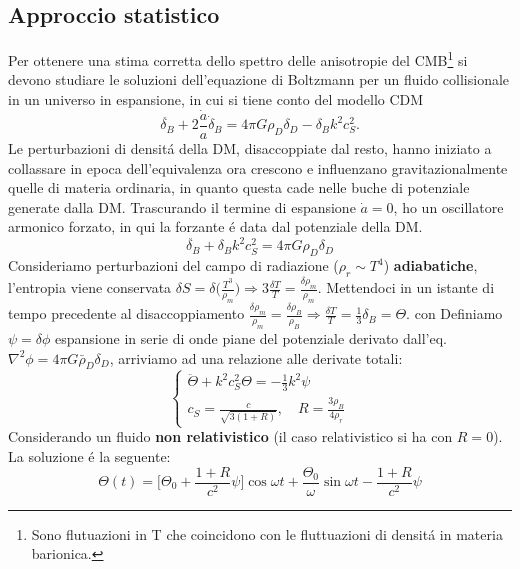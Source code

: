 \documentclass[12pt, a4paper]{article}
\begin{document}
\subsection{Approccio statistico}
Per ottenere una stima corretta dello spettro delle anisotropie del CMB\footnote{Sono flutuazioni in T che coincidono con le fluttuazioni di densit\'{a} in materia barionica.} si devono studiare le soluzioni dell'equazione di Boltzmann per un fluido collisionale in un universo in espansione, in cui si tiene conto del modello CDM
\begin{equation}
\ddot{\delta_B}+2 \frac{\dot{a}}{a}\dot{\delta}_B  =4 \pi G \rho_D \delta_D-\delta_B k^2 c_S^2.
\end{equation}
Le perturbazioni di densit\'{a} della DM, disaccoppiate dal resto,  hanno iniziato a collassare in epoca dell'equivalenza ora crescono e influenzano gravitazionalmente quelle di materia ordinaria, in quanto questa cade nelle buche di potenziale generate dalla DM. Trascurando il termine di espansione $\dot{a}=0$, ho un oscillatore armonico forzato, in qui la forzante \'{e} data dal potenziale della DM. 
\begin{equation}
\ddot{\delta_B}+ \delta_B k^2 c_S^2=4 \pi G \rho_D \delta_D
\end{equation}
Consideriamo perturbazioni del campo di radiazione ($\rho_r \sim T^4$)  \textbf{adiabatiche}, l'entropia viene conservata $\delta S=\delta \biggl(\frac{T^3}{\rho_m}\biggr) \Rightarrow 3\frac{\delta T}{T}=\frac{\delta \rho_m}{\rho_m}$. Mettendoci in un istante di tempo precedente al disaccoppiamento $\frac{\delta \rho_m}{\rho_m}=\frac{\delta \rho_B}{\rho_B} \Rightarrow \frac{\delta T}{T}=\frac{1}{3}\delta_B=\Theta$. con Definiamo $\psi=\delta \phi $ espansione in serie di onde piane del potenziale derivato dall'eq. $\nabla^2 \phi=4 \pi G \bar{\rho}_D \delta_D$, arriviamo ad una relazione alle derivate totali:
\begin{equation}
\begin{cases}
\ddot{\Theta}+k^2 c_S^2 \Theta=-\frac{1}{3}k^2 \psi
\\
c_S=\frac{c}{\sqrt{3(1+R)}}, \quad R=\frac{3\rho_B}{4\rho_r}
\end{cases}
\end{equation}
Considerando un fluido \textbf{non relativistico} (il caso relativistico si ha con $R=0$). La soluzione \'{e} la seguente:
\begin{equation}
\Theta(t)=\biggl[ \Theta_0+\frac{1+R}{c^2}\psi \biggr]\cos{\omega t}+\frac{\Theta_0}{\omega}\sin{\omega t}-\frac{1+R}{c^2} \psi
\end{equation}
\end{document}

